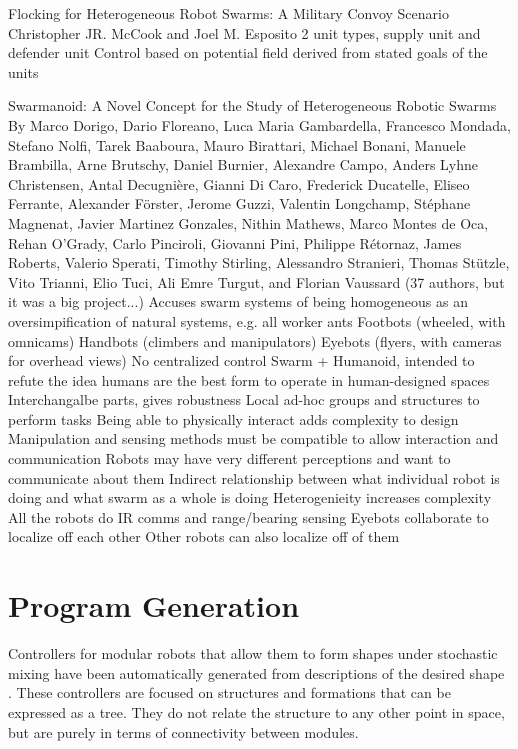 Flocking for Heterogeneous Robot Swarms: A Military Convoy Scenario
Christopher JR. McCook and Joel M. Esposito
	2 unit types, supply unit and defender unit
	Control based on potential field derived from stated goals of the units

Swarmanoid: A Novel Concept for the Study of Heterogeneous Robotic Swarms
By Marco Dorigo, Dario Floreano, Luca Maria Gambardella, Francesco Mondada, Stefano Nolfi, Tarek Baaboura, Mauro Birattari, Michael Bonani, Manuele Brambilla, Arne Brutschy, Daniel Burnier, Alexandre Campo, Anders Lyhne Christensen, Antal Decugnière, Gianni Di Caro, Frederick Ducatelle, Eliseo Ferrante, Alexander Förster, Jerome Guzzi, Valentin Longchamp, Stéphane Magnenat, Javier Martinez Gonzales, Nithin Mathews,
Marco Montes de Oca, Rehan O’Grady, Carlo Pinciroli, Giovanni Pini, Philippe Rétornaz, James Roberts, Valerio Sperati, Timothy Stirling, Alessandro Stranieri, Thomas Stützle, Vito Trianni, Elio Tuci, Ali Emre Turgut, and Florian Vaussard
(37 authors, but it was a big project...)
	Accuses swarm systems of being homogeneous as an oversimpification of natural systems, e.g. all worker ants
	Footbots (wheeled, with omnicams)
	Handbots (climbers and manipulators)
	Eyebots (flyers, with cameras for overhead views)
	No centralized control
	Swarm + Humanoid, intended to refute the idea humans are the best form to operate in human-designed spaces
	Interchangalbe parts, gives robustness
	Local ad-hoc groups and structures to perform tasks
	Being able to physically interact adds complexity to design
		Manipulation and sensing methods must be compatible to allow interaction and communication
		Robots may have very different perceptions and want to communicate about them
	Indirect relationship between what individual robot is doing and what swarm as a whole is doing
		Heterogenieity increases complexity
	All the robots do IR comms and range/bearing sensing
	Eyebots collaborate to localize off each other
		Other robots can also localize off of them

\section{Program Generation}

Controllers for modular robots that allow them to form shapes under stochastic mixing have been automatically generated from descriptions of the desired shape \citep{klavins2002automatic}. 
These controllers are focused on structures and formations that can be expressed as a tree. 
They do not relate the structure to any other point in space, but are purely in terms of connectivity between modules. 


